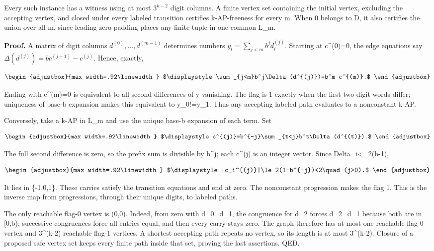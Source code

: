 Every such instance has a witness using at most \(3^{k-2}\) digit columns. A finite vertex set containing the initial vertex, excluding the accepting vertex, and closed under every labeled transition certifies k-AP-freeness for every m. When 0 belongs to D, it also certifies the union over all m, since leading zero padding places any finite tuple in one common L\_m.

\textbf{Proof.} A matrix of digit columns \(d^{(0)},\ldots,d^{(m-1)}\) determines numbers \(y_i=\sum_{j<m}b^j d_i^{(j)}\). Starting at c\^{}(0)=0, the edge equations say \(\Delta(d^{(j)})=b c^{(j+1)}-c^{(j)}\). Hence, exactly,

\[
\begin{adjustbox}{max width=.92\linewidth}
$\displaystyle \sum_{j<m}b^j\Delta(d^{(j)})=b^m c^{(m)}.$
\end{adjustbox}
\]

Ending with c\^{}(m)=0 is equivalent to all second differences of y vanishing. The flag is 1 exactly when the first two digit words differ; uniqueness of base-b expansion makes this equivalent to y\_0!=y\_1. Thus any accepting labeled path evaluates to a nonconstant k-AP.

Conversely, take a k-AP in L\_m and use the unique base-b expansion of each term. Set

\[
\begin{adjustbox}{max width=.92\linewidth}
$\displaystyle c^{(j)}=b^{-j}\sum_{t<j}b^t\Delta(d^{(t)}).$
\end{adjustbox}
\]

The full second difference is zero, so the prefix sum is divisible by b\^{}j; each c\^{}(j) is an integer vector. Since \textbar Delta\_i\textbar\textless=2(b-1),

\[
\begin{adjustbox}{max width=.92\linewidth}
$\displaystyle |c_i^{(j)}|\le2(1-b^{-j})<2\quad(j>0).$
\end{adjustbox}
\]

It lies in \{-1,0,1\}. These carries satisfy the transition equations and end at zero. The nonconstant progression makes the flag 1. This is the inverse map from progressions, through their unique digits, to labeled paths.

The only reachable flag-0 vertex is (0,0). Indeed, from zero with d\_0=d\_1, the congruence for d\_2 forces d\_2=d\_1 because both are in {[}0,b); successive congruences force all entries equal, and then every carry stays zero. The graph therefore has at most one reachable flag-0 vertex and 3\^{}(k-2) reachable flag-1 vertices. A shortest accepting path repeats no vertex, so its length is at most 3\^{}(k-2). Closure of a proposed safe vertex set keeps every finite path inside that set, proving the last assertions. QED.

